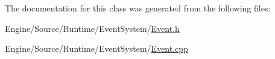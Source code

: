 The documentation for this class was generated from the following files\+:\begin{DoxyCompactItemize}
\item 
Engine/\+Source/\+Runtime/\+Event\+System/\mbox{\hyperlink{_event_8h}{Event.\+h}}\item 
Engine/\+Source/\+Runtime/\+Event\+System/\mbox{\hyperlink{_event_8cpp}{Event.\+cpp}}\end{DoxyCompactItemize}
